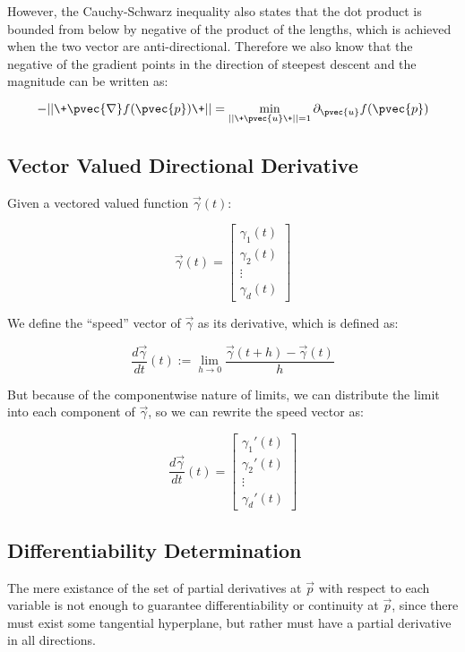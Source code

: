 \documentclass[11 pt, twoside]{article}
\begin{document}
However, the Cauchy-Schwarz inequality also states that the dot product is
bounded from below by negative of the product of the lengths, which is achieved
when the two vector are anti-directional. Therefore we also know that the
negative of the gradient points in the direction of steepest descent and the
magnitude can be written as:

$$-||\+\pvec{\nabla}f(\pvec{p})\+|| = \min_{||\+\pvec{u}\+|| = 1} \partial_{\pvec{u}}
f(\pvec{p})$$


\subsection{Vector Valued Directional Derivative}
Given a vectored valued function $\vec{\gamma}(t)$:

\begin{equation*}
\vec{\gamma}(t) = \left[
\begin{array}{c}
\gamma_1 (t)\\
\gamma_2 (t)\\
\vdots\\
\gamma_d (t)
\end{array} \right]
\end{equation*}

We define the ``speed'' vector of $\vec{\gamma}$ as its derivative, which is
defined as:

$$\frac{d\vec{\gamma}}{dt}(t) := \lim_{h\to0} \frac{\vec{\gamma}(t + h) - \vec{\gamma}(t)}{h}$$

But because of the componentwise nature of limits, we can distribute the limit
into each component of $\vec{\gamma}$, so we can rewrite the speed vector as:

\begin{equation*}
\frac{d\vec{\gamma}}{dt}(t) = \left[
\begin{array}{c}
\gamma_1' (t)\\
\gamma_2' (t)\\
\vdots\\
\gamma_d' (t)
\end{array} \right]
\end{equation*}

\subsection{Differentiability Determination}

The mere existance of the set of partial derivatives at $\vec{p}$ with respect to each variable is not enough to guarantee differentiability or continuity at $\vec{p}$, since there must exist some tangential hyperplane, but rather must have a partial derivative in all directions.
\end{document}
